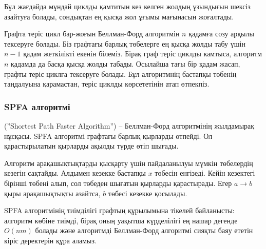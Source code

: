 Бұл жағдайда мұндай циклды қамтитын кез келген жолдың ұзындығын шексіз азайтуға болады, сондықтан ең қысқа жол ұғымы мағынасын жоғалтады.

Графта теріс цикл бар-жоғын Беллман-Форд
алгоритмін $n$ қадамға созу арқылы тексеруге
болады. Біз графтағы барлық төбелерге ең қысқа жолды табу үшін 
$n-1$ қадам жеткілікті екенін білеміз. Бірақ граф теріс 
циклды камтыса, алгоритм $n$ қадамда да басқа қысқа 
жолды табады. Осылайша тағы бір қадам жасап, графты теріс циклға
тексеруге болады. Бұл алгоритмнің бастапқы төбенің таңдалуына қарамастан, теріс циклды көрсететінін атап өтпекпіз. 

\subsubsection{SPFA алгоритмі}


 (''Shortest Path Faster Algorithm'') \cite{fan94} --
Беллман-Форд алгоритмінің жылдамырақ нұсқасы.
SPFA алгоритмі графтағы барлық қырларды өтпейді. Ол қарастырылатын қырларды ақылды түрде өтіп шығады.

Алгоритм арақашықтықтарды қысқарту үшін пайдаланылуы
мүмкін төбелердің кезегін сақтайды.
Алдымен кезекке бастапқы $x$ төбесін
енгізеді.
Кейін кезектегі бірінші төбені алып, 
сол төбеден шығатын қырларды қарастырады. Егер 
$a \rightarrow b$ қыры арақашықтықты азайтса, $b$
төбесі кезекке қосылады.
%

%

SPFA алгоритмінің тиімділігі графтың құрылымына тікелей 
байланысты: алгоритм көбіне тиімді, бірақ оның уақытша күрделілігі ең нашар дегенде $O(nm)$ болады және алгоритмді Беллман-Форд алгоритмі сияқты баяу ететін кіріс деректерін құра аламыз.

